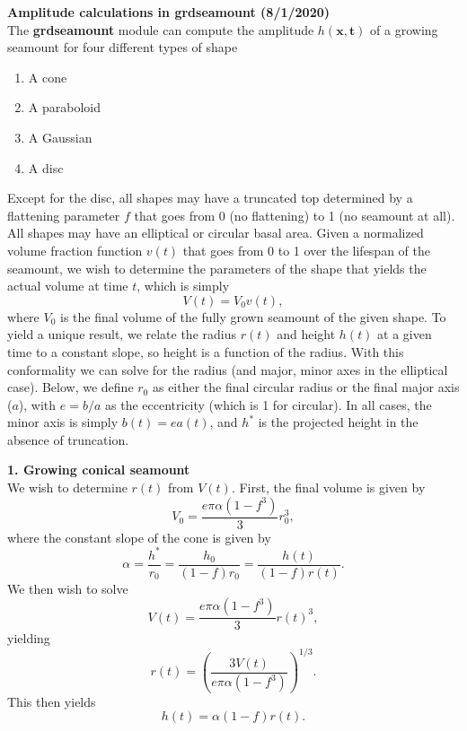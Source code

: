 \documentclass[12pt]{article}
\begin{document}

{\center \bf Amplitude calculations in grdseamount (8/1/2020)}\\

The {\bf grdseamount} module can compute the amplitude $h(\mathbf{x,t})$ of a growing seamount
for four different types of shape
\begin{enumerate}
	\item A cone
	\item A paraboloid
	\item A Gaussian
	\item A disc
\end{enumerate}
Except for the disc, all shapes may have a truncated top determined by a flattening parameter $f$
that goes from 0 (no flattening) to 1 (no seamount at all).
All shapes may have an elliptical or circular basal area.  Given a normalized volume fraction function
$v(t)$ that goes from 0 to 1 over the lifespan of the seamount, we wish to determine the
parameters of the shape that yields the actual volume at time $t$, which is simply
\begin{equation}
V(t) = V_0 v(t),
\label{eq:vt}
\end{equation}
where $V_0$ is the final volume of the fully grown seamount of the given shape. To yield a unique result, we
relate the radius $r(t)$ and height $h(t)$ at a given time to a constant slope, so height is a function
of the radius.  With this conformality we can solve for the radius (and major, minor axes in
the elliptical case).  Below, we define $r_0$ as either the final circular radius or the final
major axis ($a$), with $e = b/a$ as the eccentricity (which is 1 for circular). In all cases,
the minor axis is simply $b(t) = e a(t)$, and $h^*$ is the projected height in the absence of truncation.

{\center \bf 1. Growing conical seamount}\\

We wish to determine $r(t)$ from $V(t)$.  First, the final volume is given by
\begin{equation}
V_0 = \frac{e \pi \alpha (1 - f^3)}{3}r_0^3,
\end{equation}
where the constant slope of the cone is given by
\begin{equation}
\alpha = \frac{h^*}{r_0} = \frac{h_0}{(1-f)r_0} = \frac{h(t)}{(1-f)r(t)}.
\end{equation}
We then wish to solve
\begin{equation}
V(t) = \frac{e \pi \alpha (1 - f^3)}{3}r(t)^3,
\end{equation}
yielding
\begin{equation}
r(t) = \left ( \frac{3 V(t)}{e \pi \alpha (1 - f^3)} \right )^{1/3}.
\end{equation}
This then yields
\begin{equation}
h(t) = \alpha (1 - f) r(t).
\end{equation}
\end{document}
